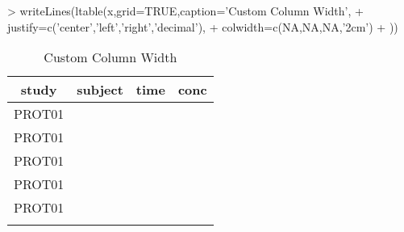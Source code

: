 \documentclass[titlepage]{article}
\begin{document}
\begin{Schunk}
\begin{Sinput}
> writeLines(ltable(x,grid=TRUE,caption='Custom Column Width',
+     justify=c('center','left','right','decimal'),
+     colwidth=c(NA,NA,NA,'2cm')
+ ))
\end{Sinput}
\begin{table}[!htpb]
 \caption[Custom Column Width]{Custom Column Width }
 \begin{center}
  \begin{tabular}{c|l|r|p{2cm}}
    \hline \hline
   study & subject & time & conc \\ \hline
   PROT01 & \verb#1001# & \verb#0# & \verb#0.12# \\ \hline
   PROT01 & \verb#1001# & \verb#1# & \verb#34   # \\ \hline
   PROT01 & \verb#1001# & \verb#2# & \verb#5.6 # \\ \hline
   PROT01 & \verb#1002# & \verb#0# & \verb#0.5 # \\ \hline
   PROT01 & \verb#1002# & \verb#1# & \verb#200   # \\ \hline
    & \verb#1002# & \verb#2# & \verb## \\ \hline
  \end{tabular}
 \end{center}
\end{table}\end{Schunk}
\end{document}
